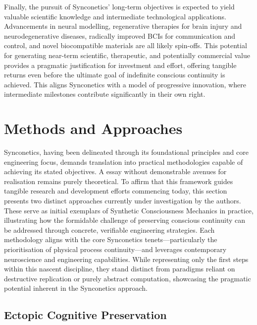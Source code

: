 \documentclass[10pt]{article}
\begin{document}
\begin{sloppypar}
  Finally, the pursuit of Synconetics' long-term objectives is expected to yield valuable scientific knowledge and intermediate technological applications. Advancements in neural modelling, regenerative therapies for brain injury and neurodegenerative diseases, radically improved BCIs for communication and control, and novel biocompatible materials are all likely spin-offs. This potential for generating near-term scientific, therapeutic, and potentially commercial value provides a pragmatic justification for investment and effort, offering tangible returns even before the ultimate goal of indefinite conscious continuity is achieved. This aligns Synconetics with a model of progressive innovation, where intermediate milestones contribute significantly in their own right.

  \section{Methods and Approaches}
  \label{sec:methods}

  Synconetics, having been delineated through its foundational principles and core engineering focus, demands translation into practical methodologies capable of achieving its stated objectives. A essay without demonstrable avenues for realisation remains purely theoretical. To affirm that this framework guides tangible research and development efforts commencing today, this section presents two distinct approaches currently under investigation by the authors. These serve as initial exemplars of Synthetic Consciousness Mechanics in practice, illustrating how the formidable challenge of preserving conscious continuity can be addressed through concrete, verifiable engineering strategies. Each methodology aligns with the core Synconetics tenets—particularly the prioritisation of physical process continuity—and leverages contemporary neuroscience and engineering capabilities. While representing only the first steps within this nascent discipline, they stand distinct from paradigms reliant on destructive replication or purely abstract computation, showcasing the pragmatic potential inherent in the Synconetics approach.

  \subsection{Ectopic Cognitive Preservation}
  \label{sec:daniel-approach}


\end{sloppypar}
\end{document}
